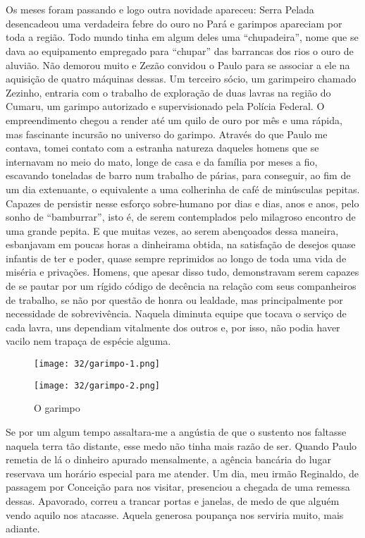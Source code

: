 \chapter{}
Os meses foram passando e logo outra novidade apareceu: Serra Pelada desencadeou uma verdadeira febre do ouro no Pará e garimpos apareciam por toda a região.
Todo mundo tinha em algum deles uma ``chupadeira'', nome que se dava ao equipamento empregado para ``chupar'' das barrancas dos rios o ouro de aluvião.
Não demorou muito e Zezão convidou o Paulo para se associar a ele na aquisição de quatro máquinas dessas.
Um terceiro sócio, um garimpeiro chamado Zezinho, entraria com o trabalho de exploração de duas lavras na região do Cumaru, um garimpo autorizado e supervisionado pela Polícia Federal.
O empreendimento chegou a render até um quilo de ouro por mês e uma rápida, mas fascinante incursão no universo do garimpo.
Através do que Paulo me contava, tomei contato com a estranha natureza daqueles homens que se internavam no meio do mato, longe de casa e da família por meses a fio, escavando toneladas de barro num trabalho de párias, para conseguir, ao fim de um dia extenuante, o equivalente a uma colherinha de café de minúsculas pepitas.
Capazes de persistir nesse esforço sobre-humano por dias e dias, anos e anos, pelo sonho de ``bamburrar'', isto é, de serem contemplados pelo milagroso encontro de uma grande pepita.
E que muitas vezes, ao serem abençoados dessa maneira, esbanjavam em poucas horas a dinheirama obtida, na satisfação de desejos quase infantis de ter e poder, quase sempre reprimidos ao longo de toda uma vida de miséria e privações.
Homens, que apesar disso tudo, demonstravam serem capazes de se pautar por um rígido código de decência na relação com seus companheiros de trabalho, se não por questão de honra ou lealdade, mas principalmente por necessidade de sobrevivência.
Naquela diminuta equipe que tocava o serviço de cada lavra, uns dependiam vitalmente dos outros e, por isso, não podia haver vacilo nem trapaça de espécie alguma.

\begin{figure}
\centering
\texttt{[image: 32/garimpo-1.png]}
\end{figure}

\begin{figure}
\centering
\texttt{[image: 32/garimpo-2.png]}
\caption{O garimpo}
\end{figure}

Se por um algum tempo assaltara-me a angústia de que o sustento nos faltasse naquela terra tão distante, esse medo não tinha mais razão de ser.
Quando Paulo remetia de lá o dinheiro apurado mensalmente, a agência bancária do lugar reservava um horário especial para me atender.
Um dia, meu irmão Reginaldo, de passagem por Conceição para nos visitar, presenciou a chegada de uma remessa dessas.
Apavorado, correu a trancar portas e janelas, de medo de que alguém vendo aquilo nos atacasse.
Aquela generosa poupança nos serviria muito, mais adiante.

